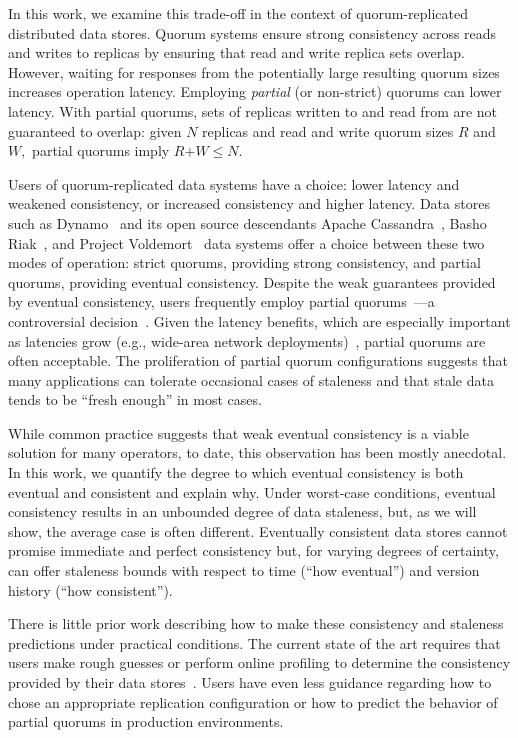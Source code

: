 \documentclass{vldb}
\begin{document}
In this work, we examine this trade-off in the context of
quorum-replicated distributed data stores. Quorum systems ensure
strong consistency across reads and writes to replicas by ensuring
that read and write replica sets overlap. However, waiting for
responses from the potentially large resulting quorum sizes increases
operation latency. Employing \textit{partial} (or non-strict) quorums
can lower latency.  With partial quorums, sets of replicas written to
and read from are not guaranteed to overlap: given $N$ replicas and
read and write quorum sizes $R$ and $W,$ partial quorums imply
$R$$+$$W$$\leq$$N$.

Users of quorum-replicated data systems have a choice: lower latency
and weakened consistency, or increased consistency and higher
latency. Data stores such as Dynamo~\cite{dynamo} and its open source
descendants Apache Cassandra~\cite{cassandra-sigmod}, Basho
Riak~\cite{riak}, and Project Voldemort~\cite{voldemortpub} data
systems offer a choice between these two modes of operation: strict
quorums, providing strong consistency, and partial quorums, providing
eventual consistency. Despite the weak guarantees provided by eventual
consistency, users frequently employ partial
quorums~\cite{cassandra-docs, cassandradefault,feinbergpc,reddit,
  outbrain, maxperfblog}---a controversial
decision~\cite{hamilton-cap, cops, walter, urbanmyths}.  Given the
latency benefits, which are especially important as latencies grow
(e.g., wide-area network deployments)~\cite{abadilatconsist,
  feinbergpc, hamilton-cap, helland}, partial quorums are often
acceptable.  The proliferation of partial quorum configurations
suggests that many applications can tolerate occasional cases of
staleness and that stale data tends to be ``fresh enough'' in most
cases.

While common practice suggests that weak eventual consistency is a
viable solution for many operators, to date, this observation has been
mostly anecdotal. In this work, we quantify the degree to which
eventual consistency is both eventual and consistent and explain
why. Under worst-case conditions, eventual consistency results in an
unbounded degree of data staleness, but, as we will show, the average
case is often different.  Eventually consistent data stores cannot
promise immediate and perfect consistency but, for varying degrees of
certainty, can offer staleness bounds with respect to time (``how
eventual'') and version history (``how consistent'').

There is little prior work describing how to make these consistency
and staleness predictions under practical conditions.  The current
state of the art requires that users make rough guesses or perform
online profiling to determine the consistency provided by their data
stores~\cite{measure-consistency, podc-hpl, consistency-cidr}. Users
have even less guidance regarding how to chose an appropriate
replication configuration or how to predict the behavior of partial
quorums in production environments.
\end{document}
